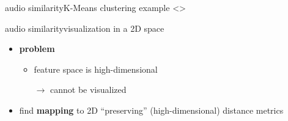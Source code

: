         \begin{frame}{audio similarity}{K-Means clustering example}
            \setcounter{i}{0}
            \setcounter{j}{1}
            {
                \only<\value{j}>{}
            }
        \end{frame}
        \begin{frame}{audio similarity}{visualization in a 2D space}
            \begin{itemize}
                \item \textbf{problem}
                    \begin{itemize}
                        \item   feature space is high-dimensional
                        \item[$\rightarrow$] cannot be visualized
                    \end{itemize}
                \bigskip
                \item<2-> find \textbf{mapping} to 2D ``preserving'' (high-dimensional) distance metrics
            \end{itemize}
        \end{frame}
            
